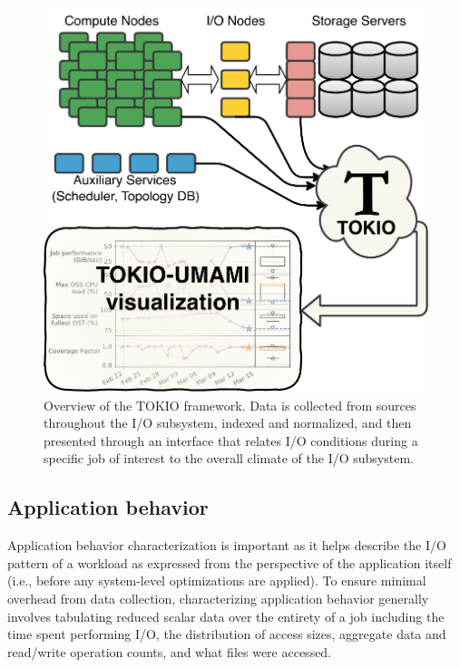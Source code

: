 \begin{figure}[t]
    \centering
    \includegraphics[width=\columnwidth]{figs/tokio-schematic.pdf}
    \caption{Overview of the TOKIO framework.  Data is collected from sources throughout the I/O subsystem, indexed and normalized, and then presented through an interface that relates I/O conditions during a specific job of interest to the overall climate of the I/O subsystem.}
    \label{fig:tokio-schematic}
\end{figure}

\subsection{Application behavior} \label{sec:methods/darshan}

Application behavior characterization is important as it helps describe the I/O pattern of a workload as expressed from the perspective of the application itself (i.e., before any system-level optimizations are applied).
To ensure minimal overhead from data collection, characterizing application behavior generally involves tabulating reduced scalar data over the entirety of a job including the time spent performing I/O, the distribution of access sizes, aggregate data and read/write operation counts, and what files were accessed.

